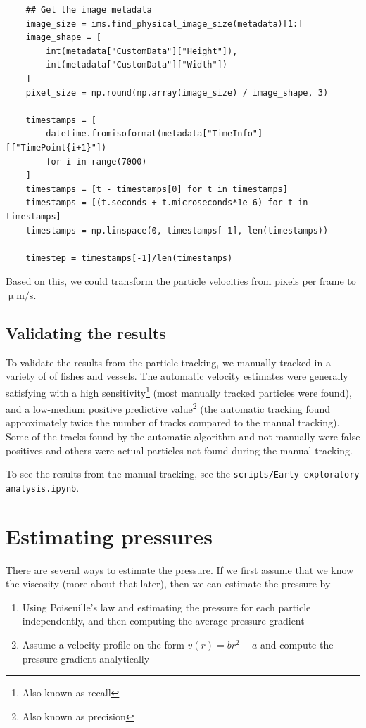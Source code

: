 \documentclass{article}
\begin{document}
\begin{verbatim}
    ## Get the image metadata
    image_size = ims.find_physical_image_size(metadata)[1:]
    image_shape = [
        int(metadata["CustomData"]["Height"]),
        int(metadata["CustomData"]["Width"])
    ]
    pixel_size = np.round(np.array(image_size) / image_shape, 3)

    timestamps = [
        datetime.fromisoformat(metadata["TimeInfo"][f"TimePoint{i+1}"])
        for i in range(7000)
    ]
    timestamps = [t - timestamps[0] for t in timestamps]
    timestamps = [(t.seconds + t.microseconds*1e-6) for t in timestamps]
    timestamps = np.linspace(0, timestamps[-1], len(timestamps))

    timestep = timestamps[-1]/len(timestamps)
\end{verbatim}

Based on this, we could transform the particle velocities from pixels per frame to $\upmu \text{m}/\text{s}$.

\subsection{Validating the results}
To validate the results from the particle tracking, we manually tracked in a variety of of fishes and vessels. The automatic velocity estimates were generally satisfying with a high sensitivity\footnote{Also known as recall} (most manually tracked particles were found), and a low-medium positive predictive value\footnote{Also known as precision} (the automatic tracking found approximately twice the number of tracks compared to the manual tracking). Some of the tracks found by the automatic algorithm and not manually were false positives and others were actual particles not found during the manual tracking.

To see the results from the manual tracking, see the \texttt{scripts/Early exploratory analysis.ipynb}.

\section{Estimating pressures}
There are several ways to estimate the pressure. If we first assume that we know the viscosity (more about that later), then we can estimate the pressure by

\begin{enumerate}
    \item Using Poiseuille's law and estimating the pressure for each particle independently, and then computing the average pressure gradient
    \item Assume a velocity profile on the form $v(r) = b r^2 - a$ and compute the pressure gradient analytically
\end{enumerate}
\end{document}
